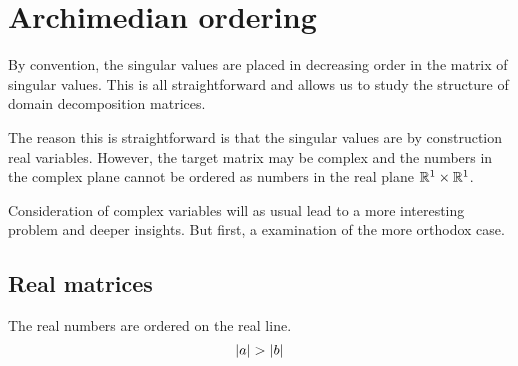 \section{Archimedian ordering}
By convention, the singular values are placed in decreasing order in the matrix of singular values. This is all straightforward and allows us to study the structure of domain decomposition matrices.

The reason this is straightforward is that the singular values are by construction real variables. However, the target matrix may be complex and the numbers in the complex plane cannot be ordered as numbers in the real plane $\mathbb{R}^{1}\times\mathbb{R}^{1}$. 

Consideration of complex variables will as usual lead to a more interesting problem and deeper insights. But first, a examination of the more orthodox case.

\subsection{Real matrices}
The real numbers are ordered on the real line. 
\begin{equation}
  \abs{a}>\abs{b}
\end{equation}


